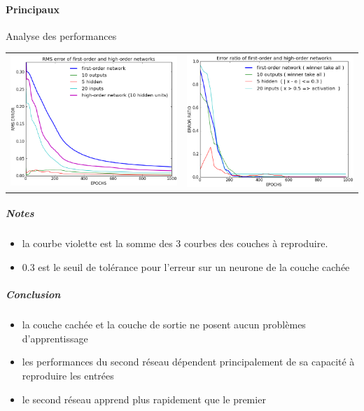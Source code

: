 \documentclass[a4paper,12pt]{article}
\begin{document}
      \paragraph*{Principaux}
	Analyse des performances
	\begin{center}
	  \begin{tabular}{lr}
	    \hspace*{-1cm}
	    \includegraphics[width=250px]{../cleeremans_2007/digit_reco/rms_ffa.png}
	    &
	    \includegraphics[width=250px]{../cleeremans_2007/digit_reco/err_ffa.png} 
	  \end{tabular}
	\end{center}
	\subparagraph*{Notes}
	  \begin{itemize}
	    \item la courbe violette est la somme des 3 courbes des couches à reproduire.
	    \item 0.3 est le seuil de tolérance pour l'erreur sur un neurone de la couche cachée
	  \end{itemize}
	\subparagraph*{Conclusion}
	  \begin{itemize}
	    \item la couche cachée et la couche de sortie ne posent aucun problèmes d'apprentissage
	    \item les performances du second réseau dépendent principalement de sa capacité à reproduire les entrées
	    \item le second réseau apprend plus rapidement que le premier
	  \end{itemize}
\end{document}
